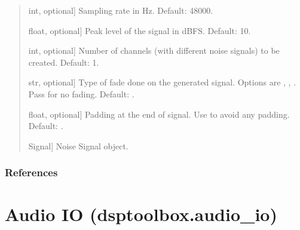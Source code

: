 \documentclass[letterpaper,10pt,english]{sphinxmanual}
\begin{document}
\begin{fulllineitems}
\begin{quote}
\begin{description}
\begin{description}
\sphinxlineitem{\sphinxstylestrong{sampling\_rate\_hz}}{[}int, optional{]}
\sphinxAtStartPar
Sampling rate in Hz. Default: 48000.

\sphinxlineitem{\sphinxstylestrong{peak\_level\_dbfs}}{[}float, optional{]}
\sphinxAtStartPar
Peak level of the signal in dBFS. Default: \sphinxhyphen{}10.

\sphinxlineitem{\sphinxstylestrong{number\_of\_channels}}{[}int, optional{]}
\sphinxAtStartPar
Number of channels (with different noise signals) to be created.
Default: 1.

\sphinxlineitem{\sphinxstylestrong{fade}}{[}str, optional{]}
\sphinxAtStartPar
Type of fade done on the generated signal. Options are ,
, . Pass  for no fading. Default: .

\sphinxlineitem{\sphinxstylestrong{padding\_end\_seconds}}{[}float, optional{]}
\sphinxAtStartPar
Padding at the end of signal. Use  to avoid any padding.
Default: .

\end{description}

\begin{description}
\sphinxlineitem{\sphinxstylestrong{noise\_sig}}{[}Signal{]}
\sphinxAtStartPar
Noise Signal object.

\end{description}

\end{description}\end{quote}
\subsubsection*{References}

\sphinxAtStartPar
{}

\end{fulllineitems}


\sphinxstepscope


\section{Audio IO (dsptoolbox.audio\_io)}
\label{\detokenize{modules/dsptoolbox.audio_io:module-dsptoolbox.audio_io}}\label{\detokenize{modules/dsptoolbox.audio_io:audio-io-dsptoolbox-audio-io}}\label{\detokenize{modules/dsptoolbox.audio_io::doc}}
\end{document}
